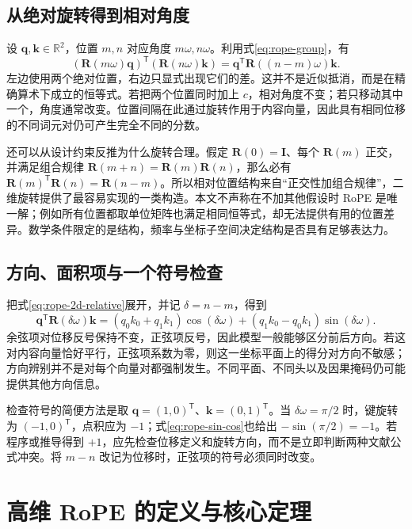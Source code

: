 \documentclass[UTF8,12pt,a4paper,fontset=fandol]{ctexart}
\begin{document}
\subsection{从绝对旋转得到相对角度}
设 $\mathbf q,\mathbf k\in\mathbb R^2$，位置 $m,n$ 对应角度 $m\omega,n\omega$。利用式\eqref{eq:rope-group}，有
\begin{equation}
(\mathbf R(m\omega)\mathbf q)^{\mathsf T}
(\mathbf R(n\omega)\mathbf k)
=\mathbf q^{\mathsf T}\mathbf R((n-m)\omega)\mathbf k.
\label{eq:rope-2d-relative}
\end{equation}
左边使用两个绝对位置，右边只显式出现它们的差。这并不是近似抵消，而是在精确算术下成立的恒等式。若把两个位置同时加上 $c$，相对角度不变；若只移动其中一个，角度通常改变。位置间隔在此通过旋转作用于内容向量，因此具有相同位移的不同词元对仍可产生完全不同的分数。

还可以从设计约束反推为什么旋转合理。假定 $\mathbf R(0)=\mathbf I$、每个 $\mathbf R(m)$ 正交，并满足组合规律 $\mathbf R(m+n)=\mathbf R(m)\mathbf R(n)$，那么必有 $\mathbf R(m)^{\mathsf T}\mathbf R(n)=\mathbf R(n-m)$。所以相对位置结构来自“正交性加组合规律”，二维旋转提供了最容易实现的一类构造。本文不声称在不加其他假设时 RoPE 是唯一解；例如所有位置都取单位矩阵也满足相同恒等式，却无法提供有用的位置差异。数学条件限定的是结构，频率与坐标子空间决定结构是否具有足够表达力。

\subsection{方向、面积项与一个符号检查}
把式\eqref{eq:rope-2d-relative}展开，并记 $\delta=n-m$，得到
\begin{equation}
\mathbf q^{\mathsf T}\mathbf R(\delta\omega)\mathbf k
=(q_0k_0+q_1k_1)\cos(\delta\omega)
+(q_1k_0-q_0k_1)\sin(\delta\omega).
\label{eq:rope-sin-cos}
\end{equation}
余弦项对位移反号保持不变，正弦项反号，因此模型一般能够区分前后方向。若这对内容向量恰好平行，正弦项系数为零，则这一坐标平面上的得分对方向不敏感；方向辨别并不是对每个向量对都强制发生。不同平面、不同头以及因果掩码仍可能提供其他方向信息。

检查符号的简便方法是取 $\mathbf q=(1,0)^{\mathsf T}$、$\mathbf k=(0,1)^{\mathsf T}$。当 $\delta\omega=\pi/2$ 时，键旋转为 $(-1,0)^{\mathsf T}$，点积应为 $-1$；式\eqref{eq:rope-sin-cos}也给出 $-\sin(\pi/2)=-1$。若程序或推导得到 $+1$，应先检查位移定义和旋转方向，而不是立即判断两种文献公式冲突。将 $m-n$ 改记为位移时，正弦项的符号必须同时改变。

\section{高维 RoPE 的定义与核心定理}
\label{sec:rope-definition}
\end{document}
